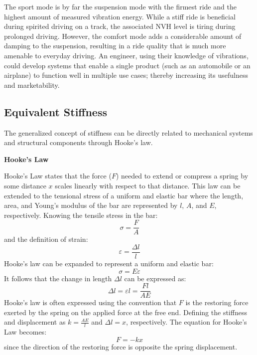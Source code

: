 \documentclass[12pt,letter]{article}
\begin{document}
\begin{vibration_case_study}
\begin{figure}[H]
				\label{fig:VW_GTI_Suspension_2}
			\end{figure}
			The sport mode is by far the suspension mode with the firmest ride and the highest amount of measured vibration energy. While a stiff ride is beneficial during spirited driving on a track, the associated NVH level is tiring during prolonged driving. However, the comfort mode adds a considerable amount of damping to the suspension, resulting in a ride quality that is much more amenable to everyday driving. An engineer, using their knowledge of vibrations, could develop systems that enable a single product (such as an automobile or an airplane) to function well in multiple use cases; thereby increasing its usefulness and marketability. 
		\end{vibration_case_study}
	
	\pagebreak	
	\subsection{Equivalent Stiffness}
		
		The generalized concept of stiffness can be directly related to mechanical systems and structural components through Hooke's law. 
		\begin{review}
						\textbf{Hooke's Law}

		\noindent Hooke's Law states that the force ($F$) needed to extend or compress a spring by some distance $x$ scales linearly with respect to that distance. This law can be extended to the tensional stress of a uniform and elastic bar where the length, area, and Young's modulus of the bar are represented by $l$, $A$, and $E$, respectively. Knowing the tensile stress in the bar:
			\begin{equation}
			\sigma = \frac{F}{A}
			\end{equation} 			
			and the definition of strain:
			\begin{equation}
			\varepsilon = \frac{\Delta l}{l}
			\end{equation} 			
			Hooke's law can be expanded to represent a uniform and elastic bar:
			\begin{equation}
			\sigma = E \varepsilon
			\end{equation} 			
			It follows that the change in length $\Delta l$ can be expressed as:		
			\begin{equation}
			\Delta l = \varepsilon l = \frac{F l}{A E}
			\end{equation} 
			Hooke's law is often expressed using the convention that $F$ is the restoring force exerted by the spring on the applied force at the free end. Defining the stiffness and displacement as $k = \frac{AE}{l}$ and $\Delta l = x$, respectively. The equation for Hooke's Law becomes:
			\begin{equation}
			F = -kx
			\end{equation} 			
			since the direction of the restoring force is opposite the spring displacement.
		\end{review}
	
\end{document}
